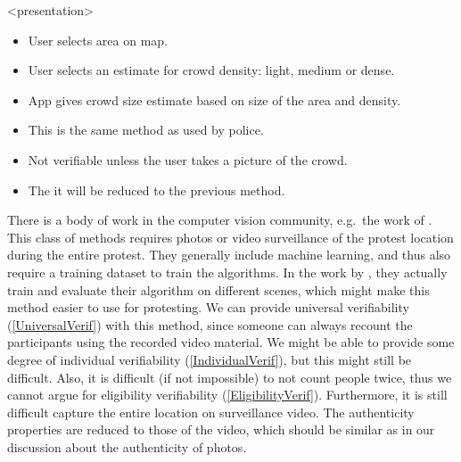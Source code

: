 \begin{frame}<presentation>
  \begin{solution}
    \begin{itemize}
      \item User selects area on map.
      \item User selects an estimate for crowd density: light, medium or dense.
      \item App gives crowd size estimate based on size of the area and 
        density.
    \end{itemize}
  \end{solution}

  \pause

  \begin{remark}
    \begin{itemize}
      \item This is the same method as used by police.
      \item Not verifiable unless the user takes a picture of the crowd.
      \item The it will be reduced to the previous method.
    \end{itemize}
  \end{remark}
\end{frame}

There is a body of work in the computer vision community, e.g.\ the work of 
\textcite{NNCrowdCounting}.
This class of methods requires photos or video surveillance of the protest 
location during the entire protest.
They generally include machine learning, and thus also require a training 
dataset to train the algorithms.
In the work by \textcite{NNCrowdCounting}, they actually train and evaluate 
their algorithm on different scenes, which might make this method easier to use 
for protesting.
We can provide universal verifiability (\cref{UniversalVerif}) with this 
method, since someone can always recount the participants using the recorded 
video material.
We might be able to provide some degree of individual verifiability 
(\cref{IndividualVerif}), but this might still be difficult.
Also, it is difficult (if not impossible) to not count people twice, thus we 
cannot argue for eligibility verifiability (\cref{EligibilityVerif}).
Furthermore, it is still difficult capture the entire location on surveillance 
video.
The authenticity properties are reduced to those of the video, which should be 
similar as in our discussion about the authenticity of photos.

